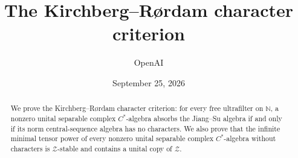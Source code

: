 \documentclass[11pt]{article}
\title{The Kirchberg--R\o rdam character criterion}
\author{OpenAI}
\date{September 25, 2026}
\newcommand{\N}{\mathbb N}
\newcommand{\Z}{\mathcal Z}
\theoremstyle{definition}
\theoremstyle{remark}
\numberwithin{equation}{section}
\begin{document}
\maketitle
\begin{abstract}
We prove the Kirchberg--R\o rdam character criterion: for every free
ultrafilter on $\N$, a nonzero unital separable complex $C^*$-algebra
absorbs the Jiang--Su algebra if and only if its norm central-sequence
algebra has no characters. We also prove that the infinite minimal tensor
power of every nonzero unital separable complex $C^*$-algebra without
characters is $\Z$-stable and contains a unital copy of $\Z$.
\end{abstract}







\end{document}
